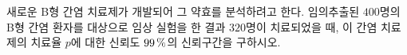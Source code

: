 새로운 B형 간염 치료제가 개발되어 그 약효를 분석하려고 한다. 임의추출된 $400$명의 B형 간염 환자를 대상으로 임상 실험을 한 결과 $320$명이 치료되었을 때, 이 간염 치료제의 치료율 $p$에 대한 신뢰도 $99\mkern3mu \%$의 신뢰구간을 구하시오. 
